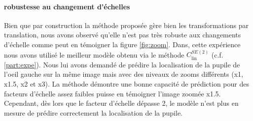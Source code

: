 \documentclass{article}
\begin{document}
\vspace{10em}
\paragraph{robustesse au changement d'échelles}\label{paragraph:robustness-to-scale}
Bien que par construction la méthode proposée gère bien les transformations par translation, nous 
avons observé qu'elle n'est pas très robuste aux changements d'échelle comme peut en témoigner la 
figure \ref{fig:zoom}. Dans, cette expérience nous avons utilisé le meilleur modèle obtenu via le méthode 
$C_{\text{lin}}^{SE(2)}$ (c.f. \ref{part:expe}). Nous lui avons demandé de prédire la localisation de la pupile de l'oeil 
gauche sur la même image mais avec des niveaux de zooms différents (x1, x1.5, x2 et x3). La méthode démontre 
une bonne capacité de prédiction pour des facteurs d'échelle assez faibles puisse en témoigner l'image zoomée 
x1.5. Cependant, dès lors que le facteur d'échelle dépasse 2, le modèle n'est plus en mesure de prédire correctement 
la localisation de la pupile.  
\end{document}
